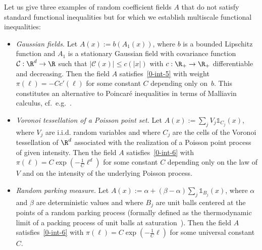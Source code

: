 Let us give three examples of random coefficient fields $A$ that do not satisfy standard functional inequalities but for which we establish multiscale functional inequalities:
\begin{itemize}
\item \emph{Gaussian fields.} Let $A(x):=b(A_1(x))$, where $b$ is a bounded Lipschitz function and $A_1$ is a stationary Gaussian field with covariance function $\mathcal C:\R^d \to \R$ such that $|\mathcal C(x)|\le c(|x|)$ with $c:\R_+\to \R_+$ differentiable and decreasing. Then the field $A$ satisfies~\eqref{0-int-5} with weight $\pi(\ell)=-C c'(\ell)$ for some constant $C$ depending only on~$b$. This constitutes an alternative to Poincaré inequalities in terms of Malliavin calculus, cf.~e.g.~\cite{Houdre-PerezAbreu-95,Nourdin-Peccati-12}.
\item \emph{Voronoi tessellation of a Poisson point set.} Let $A(x):=\sum_jV_j \mathds1_{C_j}(x)$, where $V_j$ are i.i.d. random variables and where $C_j$ are the cells of the Voronoi tessellation of $\R^d$ associated with the realization of a Poisson point process of given intensity. Then the field $A$ satisfies~\eqref{0-int-6} with $\pi(\ell)=C \exp(-\frac1C \ell^d)$ for some constant $C$ depending only on the law of $V$ and on the intensity of the underlying Poisson process.
\item \emph{Random parking measure.} Let $A(x):=\alpha+(\beta-\alpha)\sum_j \mathds1_{B_j}(x)$, where $\alpha$ and $\beta$ are deterministic values and where $B_j$ are unit balls centered at the points of a random parking process (formally defined as the thermodynamic limit of a packing process of unit balls at saturation~\cite{Penrose-01}). Then the field $A$ satisfies~\eqref{0-int-6} with $\pi(\ell)= C\exp(-\frac1C \ell)$ for some universal constant $C$.
\end{itemize}
